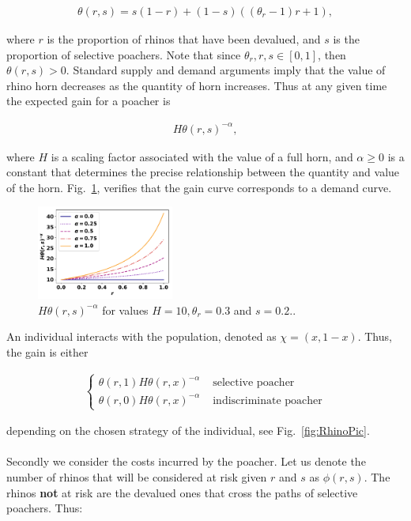 \documentclass[10pt]{article}
\begin{document}
\begin{eqnarray}
	\label{eqn:theta}
	\theta(r, s) = s (1 - r) + (1 - s) ((\theta_r - 1) r + 1),
\end{eqnarray}

where \(r\) is the proportion of rhinos that have been devalued, and \(s\) is the 
proportion of selective poachers. Note that since \(\theta_r, r, s  \in [0, 1]\), then
\(\theta(r, s) > 0\). Standard supply and demand arguments imply that the value
of rhino horn decreases as the quantity of horn increases. Thus at any given time
the expected gain for a poacher is

\begin{eqnarray}
	\label{eqn:individual_gain}
	H \theta(r,s)^{-\alpha},
\end{eqnarray}

where \(H\) is a scaling factor associated with the value of a full horn, and 
\(\alpha \geq 0\) is a constant that determines the precise relationship between
the quantity and value of the horn.  Fig.~\ref{fig:GainCurve}, verifies that the 
gain curve corresponds to a demand curve.

\begin{figure}[!htbp]
\centering
\includegraphics[width=0.4\textwidth]{images/gain_curve.pdf}
\caption{\label{fig:GainCurve} \(H \theta(r, s) ^{- \alpha}\) for values 
\(H = 10, \theta_r = 0.3\) and \(s = 0.2.\).}
\end{figure}

An individual interacts with the population, denoted as \(\chi=(x, 1 -x )\). Thus,
the gain is either

\begin{eqnarray}
	\label{eqn:gain}
	\left\{
	\begin{array}{cl}
	\theta(r, 1) H \theta(r, x)^{-\alpha} & \mbox{ selective poacher}
	\\
	\theta(r, 0) H \theta(r, x)^{-\alpha} & \mbox{ indiscriminate poacher}
	\end{array} \right.
\end{eqnarray}

depending on the chosen strategy of the individual, see Fig.~\ref{fig:RhinoPic}.
\\
\\
Secondly we consider the costs incurred by the poacher. Let us denote the number
of rhinos that will be considered at risk given \(r\) and \(s\) as \(\phi(r,s)\).
The rhinos \textbf{not} at risk are the devalued ones 
that cross the paths of selective poachers. Thus:
\end{document}
